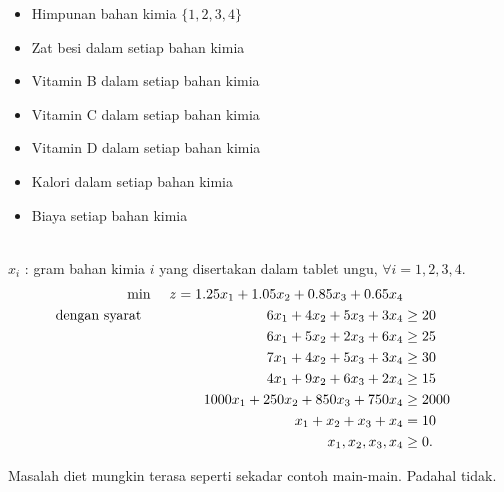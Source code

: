 \begin{solution}

\smallskip {}
\begin{itemize}
\item Himpunan bahan kimia $\{1,2,3,4\}$
\end{itemize}
\smallskip {}
\begin{itemize}
\item Zat besi dalam setiap bahan kimia
\item Vitamin B dalam setiap bahan kimia
\item Vitamin C dalam setiap bahan kimia
\item Vitamin D dalam setiap bahan kimia
\item Kalori dalam setiap bahan kimia
\item Biaya setiap bahan kimia
\end{itemize}
\smallskip {} \\
$x_i$ : gram bahan kimia $i$ yang disertakan dalam tablet ungu, $\forall i = 1,2,3,4$.\\
\smallskip {}
\begin{align*}
\min\ && z = 1.25x_1 + 1.05x_2 + 0.85x_3 + 0.65x_4 \\
\mbox{dengan syarat}\quad &&  6x_1 + 4x_2 + 5x_3 + 3x_4 &\ge 20 \\
&& 6x_1 + 5x_2 + 2x_3 + 6x_4 &\ge 25  \\
&& 7x_1 + 4x_2 + 5x_3 + 3x_4 &\ge 30  \\
&& 4x_1 + 9x_2 + 6x_3 + 2x_4 &\ge 15  \\
&& 1000x_1 + 250x_2 + 850x_3 + 750x_4 &\ge 2000 \\
&& x_1 + x_2 + x_3 + x_4 &= 10  \\
&& x_1, x_2, x_3, x_4 &\ge 0. 
\end{align*}

\end{solution}

Masalah diet mungkin terasa seperti sekadar contoh main-main. Padahal tidak.

